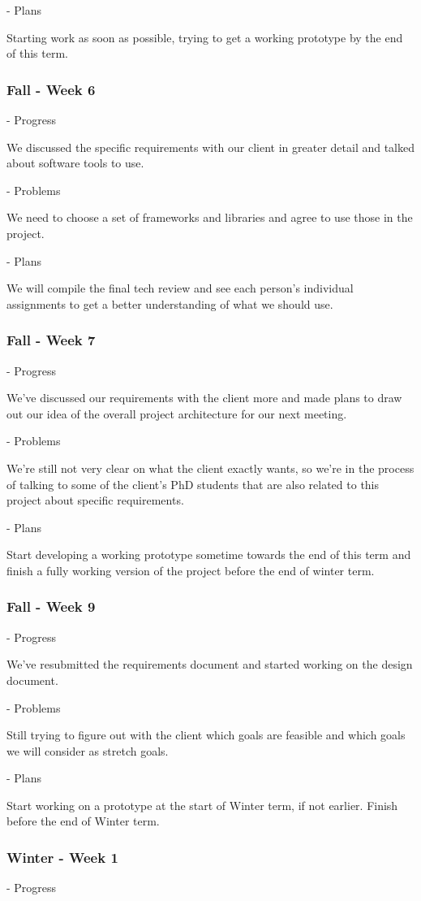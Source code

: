 \documentclass[onecolumn, draftclsnofoot,10pt, compsoc]{IEEEtran}
\begin{document}
- Plans

Starting work as soon as possible, trying to get a working prototype by the end of this term.
\subsubsection{Fall - Week 6}
- Progress

We discussed the specific requirements with our client in greater detail and talked about software tools to use.

- Problems

We need to choose a set of frameworks and libraries and agree to use those in the project.

- Plans

We will compile the final tech review and see each person's individual assignments to get a better understanding of what we should use.
\subsubsection{Fall - Week 7}
- Progress

We've discussed our requirements with the client more and made plans to draw out our idea of the overall project architecture for our next meeting.

- Problems

We're still not very clear on what the client exactly wants, so we're in the process of talking to some of the client's PhD students that are also related to this project about specific requirements.

- Plans

Start developing a working prototype sometime towards the end of this term and finish a fully working version of the project before the end of winter term.
\subsubsection{Fall - Week 9}
- Progress

We've resubmitted the requirements document and started working on the design document.

- Problems

Still trying to figure out with the client which goals are feasible and which goals we will consider as stretch goals.

- Plans

Start working on a prototype at the start of Winter term, if not earlier.
Finish before the end of Winter term.
\subsubsection{Winter - Week 1}
- Progress
\end{document}
